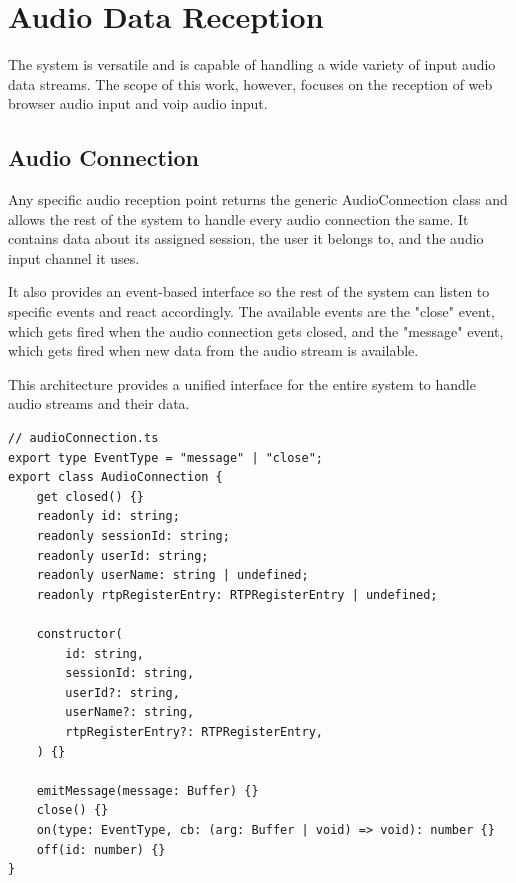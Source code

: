 \chapter{Audio Data Reception}

\label{AudioDataReception}

The system is versatile and is capable of handling a wide variety of input audio data streams. The scope of this work, 
however, focuses on the reception of web browser audio input and \ac{voip} audio input.


\section{Audio Connection}

Any specific audio reception point returns the generic AudioConnection class and allows the rest of the system to 
handle every audio connection the same. It contains data about its assigned session, the user it belongs to, and the 
audio input channel it uses.

It also provides an event-based interface so the rest of the system can listen to specific events and react  
accordingly. The available events are the "close" event, which gets fired when the audio connection gets closed, and 
the "message" event, which gets fired when new data from the audio stream is available.

This architecture provides a unified interface for the entire system to handle audio streams and their data.

\begin{verbatim}
// audioConnection.ts
export type EventType = "message" | "close";
export class AudioConnection {
    get closed() {}
    readonly id: string;
    readonly sessionId: string;
    readonly userId: string;
    readonly userName: string | undefined;
    readonly rtpRegisterEntry: RTPRegisterEntry | undefined;

    constructor(
        id: string,
        sessionId: string,
        userId?: string,
        userName?: string,
        rtpRegisterEntry?: RTPRegisterEntry,
    ) {}

    emitMessage(message: Buffer) {}
    close() {}
    on(type: EventType, cb: (arg: Buffer | void) => void): number {}
    off(id: number) {}
}
\end{verbatim}


